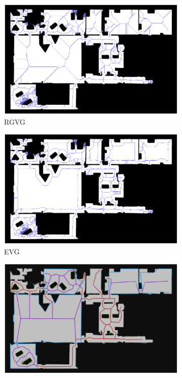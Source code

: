 \begin{figure}[h]
    \captionsetup[subfigure]{justification=centering}
    \centering
    \begin{subfigure}{.5\textwidth}
      \centering
      \includegraphics[width=\textwidth]{figures/60_results/hou2_roadmap_RGVG.png}
      \caption{RGVG}
    \end{subfigure}%
    \begin{subfigure}{.5\textwidth}
      \centering
      \includegraphics[width=\textwidth]{figures/60_results/hou2_roadmap_evg.png}
      \caption{EVG}
    \end{subfigure}
    \begin{subfigure}{.5\textwidth}
      \centering
      \includegraphics[width=\textwidth]{figures/60_results/hou2_roadmap_htm.png}

\end{subfigure}
\end{figure}
